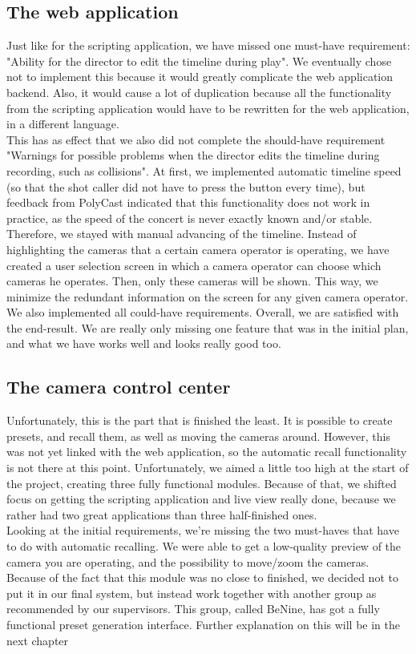 \subsection{The web application}
Just like for the scripting application, we have missed one must-have requirement: "Ability for the director to edit the timeline during play". We eventually chose not to implement this because it would greatly complicate the web application backend. Also, it would cause a lot of duplication because all the functionality from the scripting application would have to be rewritten for the web application, in a different language.\\
This has as effect that we also did not complete the should-have requirement "Warnings for possible problems when the director edits the timeline during recording, such as collisions". At first, we implemented automatic timeline speed (so that the shot caller did not have to press the button every time), but feedback from PolyCast indicated that this functionality does not work in practice, as the speed of the concert is never exactly known and/or stable. Therefore, we stayed with manual advancing of the timeline. Instead of highlighting the cameras that a certain camera operator is operating, we have created a user selection screen in which a camera operator can choose which cameras he operates. Then, only these cameras will be shown. This way, we minimize the redundant information on the screen for any given camera operator.\\
We also implemented all could-have requirements. Overall, we are satisfied with the end-result. We are really only missing one feature that was in the initial plan, and what we have works well and looks really good too.

\subsection{The camera control center}
Unfortunately, this is the part that is finished the least. It is possible to create presets, and recall them, as well as moving the cameras around. However, this was not yet linked with the web application, so the automatic recall functionality is not there at this point. Unfortunately, we aimed a little too high at the start of the project, creating three fully functional modules. Because of that, we shifted focus on getting the scripting application and live view really done, because we rather had two great applications than three half-finished ones.\\
Looking at the initial requirements, we're missing the two must-haves that have to do with automatic recalling. We were able to get a low-quality preview of the camera you are operating, and the possibility to move/zoom the cameras.\\
Because of the fact that this module was no close to finished, we decided not to put it in our final system, but instead work together with another group as recommended by our supervisors. This group, called BeNine, has got a fully functional preset generation interface. Further explanation on this will be in the next chapter

